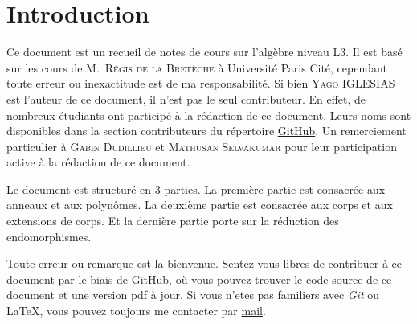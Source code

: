 
\section{Introduction}

Ce document est un recueil de notes de cours sur l'algèbre niveau L3. Il est
basé sur les cours de M.~\textsc{Régis de la Bretèche} à Université Paris Cité, cependant toute 
erreur ou inexactitude est de ma responsabilité.
Si bien \textsc{Yago IGLESIAS} est l'auteur de ce document, il n'est pas
le seul contributeur. En effet, de nombreux étudiants ont participé à la
rédaction de ce document. Leurs noms sont disponibles dans la section
contributeurs du répertoire \href{https://github.com/Yag000/algebre-II-notes/graphs/contributors}{GitHub}.
Un remerciement particulier à \textsc{Gabin Dudillieu} et \textsc{Mathusan Selvakumar} pour leur
participation active à la rédaction de ce document.
\vspace{0.5cm}

Le document est structuré en 3 parties. La première partie est consacrée aux anneaux et aux polynômes.
La deuxième partie est consacrée aux corps et aux extensions de corps. Et la dernière partie porte sur
la réduction des endomorphismes.
\vspace{0.5cm}

Toute erreur ou remarque est la bienvenue. 
Sentez vous libres de contribuer à ce document par le biais de \href{https://github.com/Yag000/algebre-II-notes}{GitHub}, 
où vous pouvez trouver le code source de ce document et une version pdf à jour.
Si vous n'etes pas familiers avec \textit{Git} ou \LaTeX , vous pouvez toujours me contacter
par \href{mailto: yago.iglesias.vazquez@gmail.com}{mail}.




